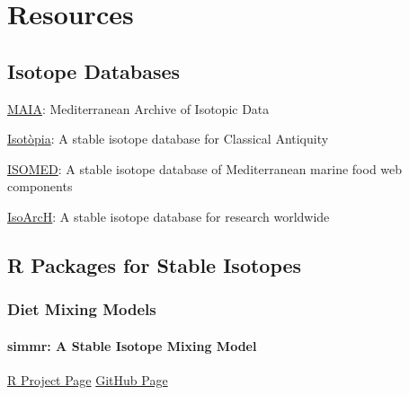 \documentclass[
  letterpaper,
  DIV=11,
  numbers=noendperiod]{scrreprt}
\begin{document}
\chapter*{Resources}\label{resources}


\section*{Isotope Databases}\label{isotope-databases}


\href{https://pandoradata.earth/my_MM/dataset/maia}{MAIA}: Mediterranean
Archive of Isotopic Data

\href{https://pandora.earth/mn_MN/dataset/isotopia-a-stable-isotope-database-for-classical-antiquity}{Isotòpia}:
A stable isotope database for Classical Antiquity

\href{https://www.seanoe.org/data/00895/100661/}{ISOMED}: A stable
isotope database of Mediterranean marine food web components

\href{https://explorer.isoarch.org/}{IsoArcH}: A stable isotope database
for research worldwide

\section*{R Packages for Stable
Isotopes}\label{r-packages-for-stable-isotopes}


\subsection*{Diet Mixing Models}\label{diet-mixing-models}

\subsubsection*{simmr: A Stable Isotope Mixing
Model}\label{simmr-a-stable-isotope-mixing-model}

\href{https://CRAN.R-project.org/package=simmr}{R Project Page}
\textbar{} \href{https://github.com/andrewcparnell/simmr}{GitHub Page}
\end{document}
